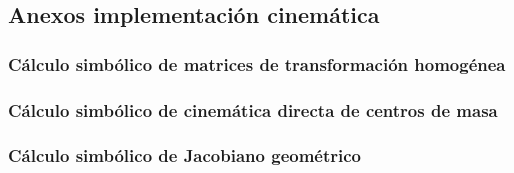 \subsection{Anexos implementación cinemática}
    \subsubsection{Cálculo simbólico de matrices de transformación homogénea} \label{cd:TH}
    

    \subsubsection{Cálculo simbólico de cinemática directa de centros de masa} \label{cd:CD}
    

    \subsubsection{Cálculo simbólico de Jacobiano geométrico} \label{cd:J}
    